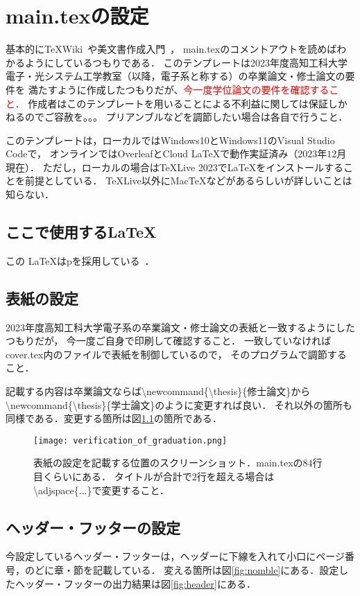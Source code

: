 \chapter{main.texの設定}
基本的に\TeX Wiki~\cite{platex}や美文書作成入門~\cite{美文書作成入門}，
main.texのコメントアウトを読めばわかるようにしているつもりである．
このテンプレートは2023年度高知工科大学 電子・光システム工学教室（以降，電子系と称する）の卒業論文・修士論文の要件を
満たすように作成したつもりだが、\textcolor{red}{今一度学位論文の要件を確認すること．}
作成者はこのテンプレートを用いることによる不利益に関しては保証しかねるのでご容赦を。。。
プリアンブルなどを調節したい場合は各自で行うこと．

このテンプレートは，ローカルではWindows10とWindows11のVisual Studio Codeで，
オンラインではOverleafとCloud LaTeXで動作実証済み（$2023$年$12$月現在）．
ただし，ローカルの場合は\TeX Live 2023で\LaTeX をインストールすることを前提としている．
\TeX Live以外にMac\TeX などがあるらしいが詳しいことは知らない．

\section{ここで使用する\LaTeX}
この \LaTeX はp\LaTeXe を採用している~\cite{美文書作成入門}．

\section{表紙の設定}
2023年度高知工科大学電子系の卒業論文・修士論文の表紙と一致するようにしたつもりだが，
今一度ご自身で印刷して確認すること．
一致していなければcover.tex内のファイルで表紙を制御しているので，
そのプログラムで調節すること．

記載する内容は卒業論文ならば\textbackslash newcommand\{\textbackslash thesis\}\{修士論文\}から
\textbackslash newcommand\{\textbackslash thesis\}\{学士論文\}のように変更すれば良い．
それ以外の箇所も同様である．変更する箇所は図\ref{fig:cover}の箇所である．

\begin{figure}[h]
  \centering
  \texttt{[image: verification\_of\_graduation.png]}
  \caption{
    表紙の設定を記載する位置のスクリーンショット．main.texの$84$行目くらいにある．
    タイトルが合計で$2$行を超える場合は\textbackslash adjspace\{...\}で変更すること．}
  \label{fig:cover}
\end{figure}

\section{ヘッダー・フッターの設定}
今設定しているヘッダー・フッターは，ヘッダーに下線を入れて小口にページ番号，のどに章・節を記載している．
変える箇所は図\ref{fig:nomble}にある．設定したヘッダー・フッターの出力結果は図\ref{fig:header}にある．

